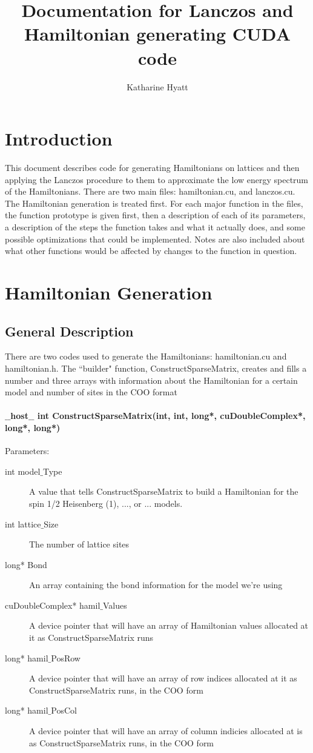 \documentclass{article}
\author{Katharine Hyatt}
\title{Documentation for Lanczos and Hamiltonian generating CUDA code}
\begin{document}
\maketitle

\section{Introduction}

This document describes code for generating Hamiltonians on lattices and then applying the Lanczos procedure to them to approximate the low energy spectrum of the Hamiltonians. There are two main files: hamiltonian.cu, and lanczos.cu. The Hamiltonian generation is treated first. For each major function in the files, the function prototype is given first, then a description of each of its parameters, a description of the steps the function takes and what it actually does, and some possible optimizations that could be implemented. Notes are also included about what other functions would be affected by changes to the function in question.

\section{Hamiltonian Generation}

\subsection{General Description}

There are two codes used to generate the Hamiltonians: hamiltonian.cu and hamiltonian.h. The ``builder" function, ConstructSparseMatrix, creates and fills a number and three arrays with information about the Hamiltonian for a certain model and number of sites in the COO format

\paragraph{$\_\_$host$\_\_$ int ConstructSparseMatrix(int, int, long*, cuDoubleComplex*, long*, long*)}

Parameters:
\begin{description}
\item[int model$\_$Type] A value that tells ConstructSparseMatrix to build a Hamiltonian for the spin 1/2 Heisenberg (1), ..., or ... models.
\item[int lattice$\_$Size] The number of lattice sites
\item[long* Bond] An array containing the bond information for the model we're using 
\item[cuDoubleComplex* hamil$\_$Values] A device pointer that will have an array of Hamiltonian values allocated at it as ConstructSparseMatrix runs
\item[long* hamil$\_$PosRow] A device pointer that will have an array of row indices allocated at it as ConstructSparseMatrix runs, in the COO form
\item[long* hamil$\_$PosCol] A device pointer that will have an array of column indicies allocated at is as ConstructSparseMatrix runs, in the COO form
\end{description}
\end{document}
